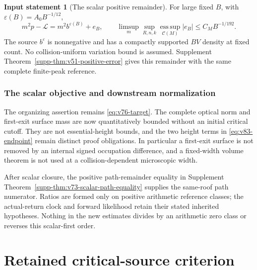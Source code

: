 \documentclass[11pt,reqno]{amsart}
\numberwithin{equation}{section}
\theoremstyle{definition}\newtheorem{definition}[theorem]{Definition}
\theoremstyle{remark}\newtheorem{remark}[theorem]{Remark}
\theoremstyle{definition}\newtheorem{inputstatement}[theorem]{Input statement}
\newcommand{\esssup}{\operatorname*{ess\,sup}}
\begin{document}
\begin{inputstatement}[The scalar positive remainder]
\label{input:v83-scalar}
For large fixed $B$, with $\varepsilon(B)=A_0B^{-1/12}$,
\begin{equation}\label{eq:v76-remainder}
 m^2p-\mathcal L=m^2b^{\varepsilon(B)}+e_B,\qquad
 \limsup_m\sup_{R,n,k}\esssup_{\mathcal C(M)}|e_B|
                                      \le C_MB^{-1/192}.
\end{equation}
The source $b^\varepsilon$ is nonnegative and has a compactly supported
$BV$ density at fixed count. No collision-uniform variation bound is
assumed. Supplement Theorem~\ref{supp-thm:v51-positive-error} gives
this remainder with the same complete finite-peak reference.
\end{inputstatement}





\section{The scalar objective and downstream normalization}
The organizing assertion remains \eqref{eq:v76-target}. The complete
optical norm and first-exit surface mass are now quantitatively bounded
without an initial critical cutoff. They are not essential-height
bounds, and the two height terms in \eqref{eq:v83-endpoint} remain
distinct proof obligations. In particular a first-exit surface is not
removed by an internal signed occupation difference, and a fixed-width
volume theorem is not used at a collision-dependent microscopic width.

After scalar closure, the positive path-remainder equality in
Supplement Theorem~\ref{supp-thm:v73-scalar-path-equality} supplies
the same-roof path numerator. Ratios are formed only on positive
arithmetic reference classes; the actual-return clock and forward
likelihood retain their stated inherited hypotheses. Nothing in the
new estimates divides by an arithmetic zero class or reverses this
scalar-first order.

\appendix


\endgroup
\part{Retained critical-source criterion}
\begingroup
\let\ArchiveLabel\label
\let\ArchiveRef\ref
\renewcommand{\label}[1]{\ArchiveLabel{v82archive:#1}}
\renewcommand{\ref}[1]{%
  \IfBeginWith{#1}{supp-}{%
    \StrBehind{#1}{supp-}[\ArchiveTarget]%
    \ArchiveRef{\ArchiveTarget}%
  }{\ArchiveRef{v82archive:#1}}%
}
\makeatletter
\let\ltx@label\label
\makeatother
\end{document}
